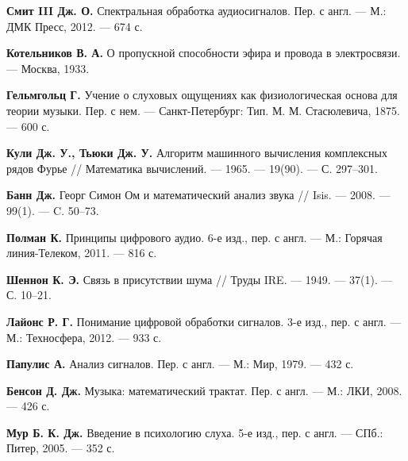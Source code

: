 \documentclass[bachelor, och, diploma]{SCWorks}
\begin{document}
\begin{thebibliography}{99}
\textbf{Смит III Дж. О.} 
Спектральная обработка аудиосигналов.  
Пер. с англ.  
--- М.: ДМК Пресс, 2012.  
--- 674 с. 

\textbf{Котельников В. А.} 
О пропускной способности эфира и провода в электросвязи.  
--- Москва, 1933.  

\textbf{Гельмгольц Г.} 
Учение о слуховых ощущениях как физиологическая основа для теории музыки.  
Пер. с нем.  
--- Санкт-Петербург: Тип. М. М. Стасюлевича, 1875.  
--- 600 с. 

\textbf{Кули Дж. У., Тьюки Дж. У.} 
Алгоритм машинного вычисления комплексных рядов Фурье // Математика вычислений.  
--- 1965.  
--- 19(90).  
--- С. 297--301. 

\textbf{Банн Дж.} 
Георг Симон Ом и математический анализ звука // Isis.  
--- 2008.  
--- 99(1).  
--- C. 50--73. 

\textbf{Полман К.} 
Принципы цифрового аудио.  
6-е изд., пер. с англ.  
--- М.: Горячая линия-Телеком, 2011.  
--- 816 с. 

\textbf{Шеннон К. Э.} 
Связь в присутствии шума // Труды IRE.  
--- 1949.  
--- 37(1).  
--- С. 10--21. 

\textbf{Лайонс Р. Г.} 
Понимание цифровой обработки сигналов.  
3-е изд., пер. с англ.  
--- М.: Техносфера, 2012.  
--- 933 с. 

\textbf{Папулис А.} 
Анализ сигналов.  
Пер. с англ.  
--- М.: Мир, 1979.  
--- 432 с. 

\textbf{Бенсон Д. Дж.} 
Музыка: математический трактат.  
Пер. с англ.  
--- М.: ЛКИ, 2008.  
--- 426 с. 

\textbf{Мур Б. К. Дж.} 
Введение в психологию слуха.  
5-е изд., пер. с англ.  
--- СПб.: Питер, 2005.  
--- 352 с. 

\end{thebibliography}
\end{document}
